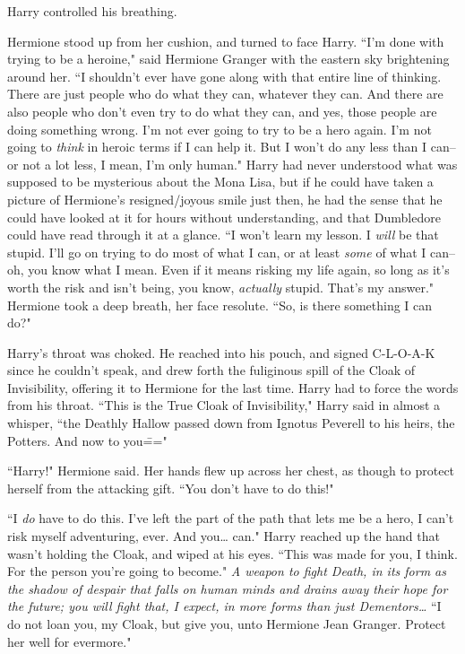 Harry controlled his breathing.

Hermione stood up from her cushion, and turned to face Harry. ``I'm done with trying to be a heroine," said Hermione Granger with the eastern sky brightening around her. ``I shouldn't ever have gone along with that entire line of thinking. There are just people who do what they can, whatever they can. And there are also people who don't even try to do what they can, and yes, those people are doing something wrong. I'm not ever going to try to be a hero again. I'm not going to \emph{think} in heroic terms if I can help it. But I won't do any less than I can\---or not a lot less, I mean, I'm only human." Harry had never understood what was supposed to be mysterious about the Mona Lisa, but if he could have taken a picture of Hermione's resigned/joyous smile just then, he had the sense that he could have looked at it for hours without understanding, and that Dumbledore could have read through it at a glance. ``I won't learn my lesson. I \emph{will} be that stupid. I'll go on trying to do most of what I can, or at least \emph{some} of what I can\---oh, you know what I mean. Even if it means risking my life again, so long as it's worth the risk and isn't being, you know, \emph{actually} stupid. That's my answer." Hermione took a deep breath, her face resolute. ``So, is there something I can do?"

Harry's throat was choked. He reached into his pouch, and signed C-L-O-A-K since he couldn't speak, and drew forth the fuliginous spill of the Cloak of Invisibility, offering it to Hermione for the last time. Harry had to force the words from his throat. ``This is the True Cloak of Invisibility," Harry said in almost a whisper, ``the Deathly Hallow passed down from Ignotus Peverell to his heirs, the Potters. And now to you\==="

``Harry!" Hermione said. Her hands flew up across her chest, as though to protect herself from the attacking gift. ``You don't have to do this!"

``I \emph{do} have to do this. I've left the part of the path that lets me be a hero, I can't risk myself adventuring, ever. And you{\ldots} can." Harry reached up the hand that wasn't holding the Cloak, and wiped at his eyes. ``This was made for you, I think. For the person you're going to become." \emph{A weapon to fight Death, in its form as the shadow of despair that falls on human minds and drains away their hope for the future; you will fight that, I expect, in more forms than just Dementors{\ldots}} ``I do not loan you, my Cloak, but give you, unto Hermione Jean Granger. Protect her well for evermore."


